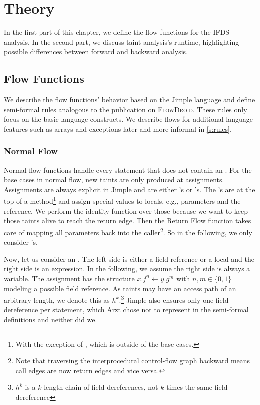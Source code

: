 \documentclass[../draft.tex]{subfiles}
\begin{document}
    \chapter{Theory}
    In the first part of this chapter, we define the flow functions for the IFDS analysis. In the second part, we discuss taint analysis's runtime, highlighting possible differences between forward and backward analysis.

    \section{Flow Functions}\label{s:flowfunctions}
    We describe the flow functions' behavior based on the Jimple language and define semi-formal rules analogous to the publication\cite{Arzt2017PhD} on \textsc{FlowDroid}. These rules only focus on the basic language constructs. We describe flows for additional language features such as arrays and exceptions later and more informal in \autoref{s:rules}.

    \subsection{Normal Flow}\label{s:normalflow}
    Normal flow functions handle every statement that does not contain an .
    For the base cases in normal flow, new taints are only produced at assignments. Assignments are always explicit in Jimple and are either 's or 's. The 's are at the top of a method\footnote{With the exception of , which is outside of the base cases.} and assign special values to locals, e.g., parameters and the  reference. We perform the identity function over those because we want to keep those taints alive to reach the return edge. Then the Return Flow function takes care of mapping all parameters back into the caller\footnote{Note that traversing the interprocedural control-flow graph backward means call edges are now return edges and vice versa.}. So in the following, we only consider 's.

    Now, let us consider an . The left side is either a field reference or a local and the right side is an expression.
    In the following, we assume the right side is always a variable.
    The assignment has the structure $x.f^n \leftarrow y.g^m$ with $n,m \in \{0,1\}$ modeling a possible field reference.
    As taints may have an access path of an arbitrary length, we denote this as $h^k$.\footnote{$h^k$ is a $k$-length chain of field dereferences, not $k$-times the same field dereference}
    Jimple also ensures only one field dereference per statement, which Arzt chose not to represent in the semi-formal definitions and neither did we. 
\end{document}
